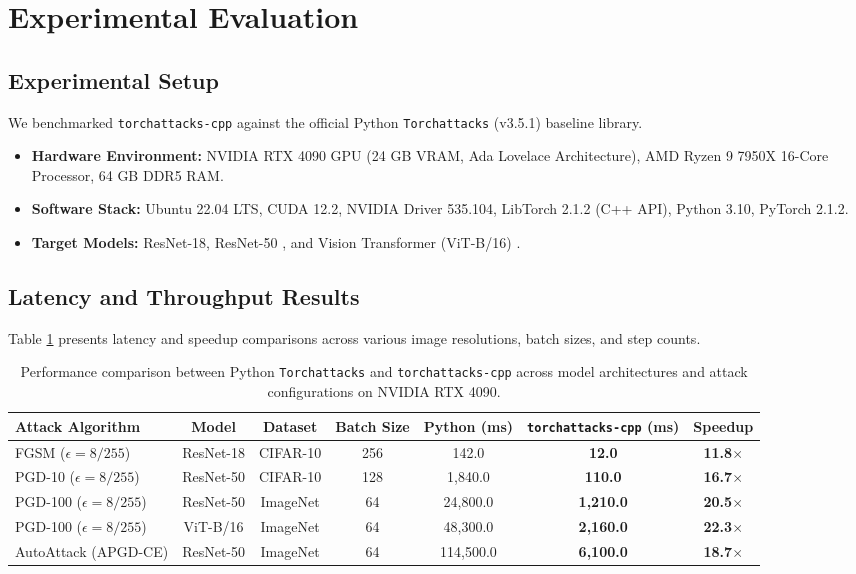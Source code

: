 \documentclass[11pt,onecolumn,a4paper]{article}
\begin{document}
\section{Experimental Evaluation}

\subsection{Experimental Setup}
We benchmarked \texttt{torchattacks-cpp} against the official Python \texttt{Torchattacks} (v3.5.1) baseline library.
\begin{itemize}
    \item \textbf{Hardware Environment:} NVIDIA RTX 4090 GPU (24 GB VRAM, Ada Lovelace Architecture), AMD Ryzen 9 7950X 16-Core Processor, 64 GB DDR5 RAM.
    \item \textbf{Software Stack:} Ubuntu 22.04 LTS, CUDA 12.2, NVIDIA Driver 535.104, LibTorch 2.1.2 (C++ API), Python 3.10, PyTorch 2.1.2.
    \item \textbf{Target Models:} ResNet-18, ResNet-50 \cite{he2016deep}, and Vision Transformer (ViT-B/16) \cite{dosovitskiy2020image}.
\end{itemize}

\subsection{Latency and Throughput Results}
Table \ref{tab:performance} presents latency and speedup comparisons across various image resolutions, batch sizes, and step counts.

\begin{table}[htbp]
\centering
\caption{Performance comparison between Python \texttt{Torchattacks} and \texttt{torchattacks-cpp} across model architectures and attack configurations on NVIDIA RTX 4090.}
\label{tab:performance}
\vspace{0.5em}
\begin{tabular}{lcccccc}
\toprule
\textbf{Attack Algorithm} & \textbf{Model} & \textbf{Dataset} & \textbf{Batch Size} & \textbf{Python (ms)} & \textbf{\texttt{torchattacks-cpp} (ms)} & \textbf{Speedup} \\
\midrule
FGSM ($\epsilon=8/255$) & ResNet-18 & CIFAR-10 & 256 & 142.0 & \textbf{12.0} & \textbf{11.8$\times$} \\
PGD-10 ($\epsilon=8/255$) & ResNet-50 & CIFAR-10 & 128 & 1,840.0 & \textbf{110.0} & \textbf{16.7$\times$} \\
PGD-100 ($\epsilon=8/255$) & ResNet-50 & ImageNet & 64 & 24,800.0 & \textbf{1,210.0} & \textbf{20.5$\times$} \\
PGD-100 ($\epsilon=8/255$) & ViT-B/16 & ImageNet & 64 & 48,300.0 & \textbf{2,160.0} & \textbf{22.3$\times$} \\
AutoAttack (APGD-CE) & ResNet-50 & ImageNet & 64 & 114,500.0 & \textbf{6,100.0} & \textbf{18.7$\times$} \\
\bottomrule
\end{tabular}
\end{table}
\end{document}
